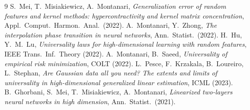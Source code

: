 \documentclass[11pt]{article}
\theoremstyle{remark}
\begin{document}
\begin{thebibliography}{9}
 S.~Mei, T.~Misiakiewicz, A.~Montanari, \emph{Generalization error of random features and kernel methods: hypercontractivity and kernel matrix concentration}, Appl.\ Comput.\ Harmon.\ Anal.\ (2022).
 A.~Montanari, Y.~Zhong, \emph{The interpolation phase transition in neural networks}, Ann.\ Statist.\ (2022).
 H.~Hu, Y.~M.~Lu, \emph{Universality laws for high-dimensional learning with random features}, IEEE Trans.\ Inf.\ Theory (2022).
 A.~Montanari, B.~Saeed, \emph{Universality of empirical risk minimization}, COLT (2022).
 L.~Pesce, F.~Krzakala, B.~Loureiro, L.~Stephan, \emph{Are Gaussian data all you need? The extents and limits of universality in high-dimensional generalized linear estimation}, ICML (2023).
 B.~Ghorbani, S.~Mei, T.~Misiakiewicz, A.~Montanari, \emph{Linearized two-layers neural networks in high dimension}, Ann.\ Statist.\ (2021).
\end{thebibliography}
\end{document}
